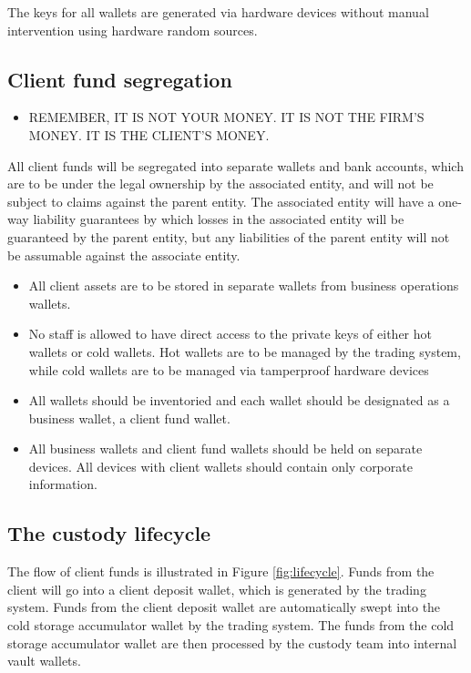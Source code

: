 The keys for all wallets are generated via hardware devices without
manual intervention using hardware random sources. 

\subsection{Client fund segregation}
\begin{itemize}
\item REMEMBER, IT IS NOT YOUR MONEY.  IT IS NOT THE FIRM'S MONEY.  IT IS THE CLIENT'S MONEY.
\end{itemize}

All client funds will be segregated into separate wallets and bank
accounts, which are to be under the legal ownership by the associated
entity, and will not be subject to claims against the parent entity.
The associated entity will have a one-way liability guarantees by
which losses in the associated entity will be guaranteed by the parent
entity, but any liabilities of the parent entity will not be assumable
against the associate entity.

\begin{itemize}
  \item All client assets are to be stored in separate wallets from
    business operations wallets.
  \item No staff is allowed to have direct access to the private keys
    of either hot
    wallets or cold wallets.  Hot wallets are to be managed by the
    trading system, while cold wallets are to be managed via
    tamperproof hardware devices 
  \item All wallets should be inventoried and each wallet should be designated
    as a business wallet, a client fund wallet.
  \item All business wallets and client fund wallets should be held on
separate devices.  All devices with client wallets should contain only
corporate information.
\end{itemize}

\subsection{The custody lifecycle}
The flow of client funds is illustrated in Figure \ref{fig:lifecycle}.  Funds from the
client will go into a client deposit wallet, which is generated by the
trading system.  Funds from the client deposit wallet are
automatically swept into the cold storage accumulator wallet by the trading
system.  The funds from the cold storage accumulator wallet are then
processed by the custody team into internal vault wallets.

